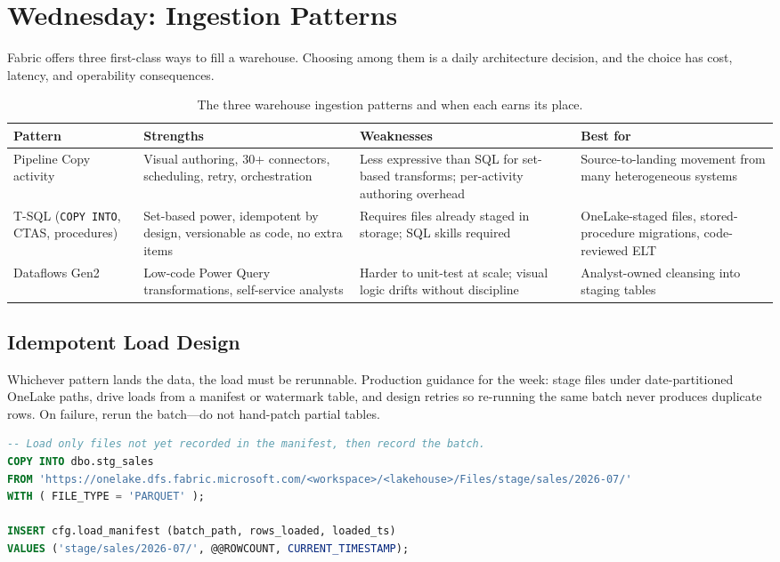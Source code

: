 \section{Wednesday: Ingestion Patterns}
Fabric offers three first-class ways to fill a warehouse. Choosing among them is a daily architecture decision, and the choice has cost, latency, and operability consequences.

\begin{table}[H]
\centering
\small
\begin{tabular}{@{}p{2.6cm}p{4.0cm}p{3.8cm}p{3.6cm}@{}}
\toprule
\textbf{Pattern} & \textbf{Strengths} & \textbf{Weaknesses} & \textbf{Best for} \\
\midrule
Pipeline Copy activity & Visual authoring, 30+ connectors, scheduling, retry, orchestration & Less expressive than SQL for set-based transforms; per-activity authoring overhead & Source-to-landing movement from many heterogeneous systems \\
T-SQL (\texttt{COPY INTO}, CTAS, procedures) & Set-based power, idempotent by design, versionable as code, no extra items & Requires files already staged in storage; SQL skills required & OneLake-staged files, stored-procedure migrations, code-reviewed ELT \\
Dataflows Gen2 & Low-code Power Query transformations, self-service analysts & Harder to unit-test at scale; visual logic drifts without discipline & Analyst-owned cleansing into staging tables \\
\bottomrule
\end{tabular}
\caption{The three warehouse ingestion patterns and when each earns its place.}
\label{tab:chapter5-ingestion-patterns}
\end{table}

\subsection{Idempotent Load Design}
Whichever pattern lands the data, the load must be rerunnable. Production guidance for the week: stage files under date-partitioned OneLake paths, drive loads from a manifest or watermark table, and design retries so re-running the same batch never produces duplicate rows. On failure, rerun the batch---do not hand-patch partial tables.

\begin{lstlisting}[language=SQL,caption={Manifest-driven idempotent load: only unprocessed files load, and the manifest records the batch.},label={lst:chapter5-idempotent-load}]
-- Load only files not yet recorded in the manifest, then record the batch.
COPY INTO dbo.stg_sales
FROM 'https://onelake.dfs.fabric.microsoft.com/<workspace>/<lakehouse>/Files/stage/sales/2026-07/'
WITH ( FILE_TYPE = 'PARQUET' );

INSERT cfg.load_manifest (batch_path, rows_loaded, loaded_ts)
VALUES ('stage/sales/2026-07/', @@ROWCOUNT, CURRENT_TIMESTAMP);
\end{lstlisting}

